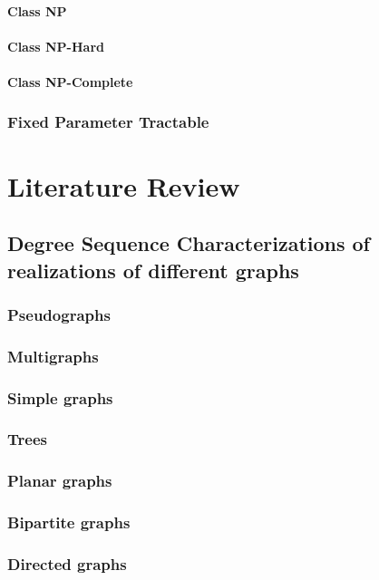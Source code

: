 \documentclass[11pt]{article}
\begin{document}
           \paragraph{Class NP}
           \paragraph{Class NP-Hard}
           \paragraph{Class NP-Complete}
      
       \subsubsection{Fixed Parameter Tractable}

\section{Literature Review}
 
      \subsection{Degree Sequence Characterizations of realizations of different graphs}
         \subsubsection{Pseudographs}
         \subsubsection{Multigraphs} 
         \subsubsection{Simple graphs} 
         \subsubsection{Trees} 
         \subsubsection{Planar graphs}
         \subsubsection{Bipartite graphs}
         \subsubsection{Directed graphs}
\end{document}
